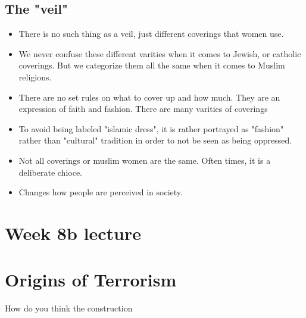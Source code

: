 \documentclass{article}
\begin{document}
\subsection{The "veil"}
\begin{itemize}
  \item There is no such thing as a veil, just different coverings that
    women use.
  \item We never confuse these different varities when it comes to Jewish, or catholic
    coverings. But we categorize them all the same when it comes to Muslim religions.
  \item There are no set rules on what to cover up and how much. They are
    an expression of faith and fashion. There are many varities of coverings
  \item To avoid being labeled "islamic dress", it is rather portrayed as "fashion"
    rather than "cultural" tradition in order to not be seen as being oppressed.
  \item Not all coverings or muslim women are the same. Often times, it is a deliberate
    chioce.
  \item Changes how people are perceived in society.
\end{itemize}

\section*{Week 8b lecture}

\section{Origins of Terrorism}
How do you think the construction
\end{document}
